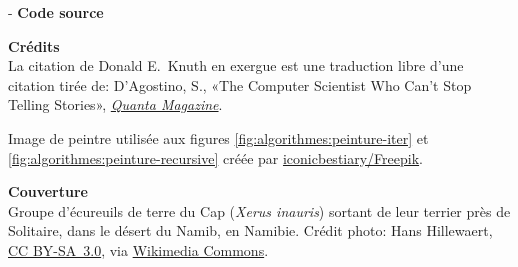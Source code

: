 \begin{adjustwidth*}{\unitlength}{-\unitlength}
  \textbf{Code source} \\
  \viewsource{\reposurl}

  \textbf{Crédits} \\
  La citation de Donald E.~Knuth en exergue est une traduction
  libre d'une citation tirée de: D'Agostino, S., «The Computer Scientist
  Who Can’t Stop Telling Stories»,
  \href{https://www.quantamagazine.org/computer-scientist-donald-knuth-cant-stop-telling-stories-20200416/}{\emph{Quanta Magazine}}.

  Image de peintre utilisée aux figures
  \ref*{fig:algorithmes:peinture-iter} et
  \ref*{fig:algorithmes:peinture-recursive} créée par
  \href{https://www.freepik.com}{iconicbestiary/Freepik}.

  \textbf{Couverture} \\
  Groupe d'écureuils de terre du Cap (\emph{Xerus inauris}) sortant de
  leur terrier près de Solitaire, dans le désert du Namib, en Namibie.
  Crédit photo: {\textcopyright} Hans Hillewaert,
  \href{https://creativecommons.org/licenses/by-sa/3.0/deed.fr}{CC
    BY-SA~3.0}, via
  \href{https://commons.wikimedia.org/w/index.php?curid=2429056}{Wikimedia
    Commons}.
\end{adjustwidth*}
\endgroup

